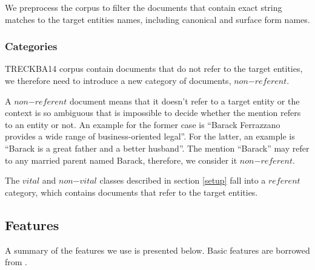 \documentclass{article}
\begin{document}
We preprocess the corpus to filter the documents that contain exact string matches to the target entities names, including canonical and surface form names.

\subsubsection{Categories}
\label{subcat}

TRECKBA14 corpus contain documents that do not refer to the target entities, we therefore need to introduce a new category of documents, $non\mathord{-}referent$. 

A $non\mathord{-}referent$ document means that it doesn't refer to a target entity or the context is so ambiguous that is impossible to decide whether the mention refers to an entity or not. An example for the former case is ``Barack Ferrazzano provides a wide range of business-oriented legal''. For the latter, an example is ``Barack is a great father and a better husband''. The mention ``Barack'' may refer to any married parent named Barack, therefore, we consider it $non\mathord{-}referent$.

The $vital$ and $non\mathord{-}vital$ classes described in section \ref{setup} fall into a $referent$ category, which contains documents that refer to the target entities.

\subsection{Features}
\label{feat}

A summary of the features we use is presented below. Basic features are borrowed from \cite{jingang13}.
\end{document}
